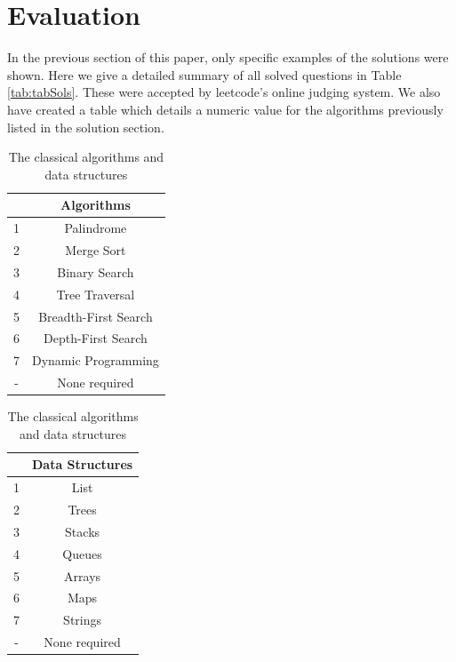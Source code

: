 \documentclass[10pt,twocolumn]{IEEEtran}
\begin{document}
\section{Evaluation}
In the previous section of this paper, only specific examples of the solutions were shown. Here we give a detailed summary of all solved questions in Table \ref{tab:tabSols}. These were accepted by leetcode's online judging system. 
We also have created a table which details a numeric value for the algorithms previously listed in the solution section.
\begin{table}
\parbox{.45\linewidth}{
\centering
\begin{tabular}{|c|c|}
		    &Algorithms \\ \hline
		1 & Palindrome\\ \hline
		2 & Merge Sort\\ \hline
		3 & Binary Search\\ \hline
		4 & Tree Traversal \\ \hline
		5 & Breadth-First Search\\ \hline
		6 & Depth-First Search\\ \hline
		7 & Dynamic Programming\\ \hline
		- & None required\\ \hline
\end{tabular}
\caption{The classical algorithms and data structures}
\label{tab:classicalAlgos}
}
\hfill
\parbox{.45\linewidth}{
\centering
\begin{tabular}{|c|c|}
	&Data Structures \\ \hline
	1 & List\\ \hline
	2 & Trees\\ \hline
	3 & Stacks\\ \hline
	4 & Queues \\ \hline
	5 & Arrays\\ \hline
	6 & Maps\\ \hline	
	7&Strings\\ \hline
	-&None required\\
\end{tabular}
}
\end{table}
\end{document}
